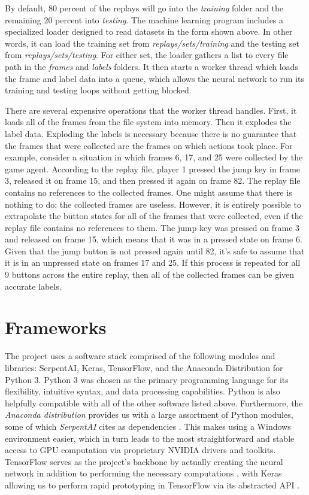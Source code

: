 By default, 80 percent of the replays will go into the \textit{training} folder and the remaining 20 percent into \textit{testing}. The machine learning program includes a specialized loader designed to read datasets in the form shown above. In other words, it can load the training set from \textit{replays/sets/training} and the testing set from \textit{replays/sets/testing}. For either set, the loader gathers a list to every file path in the \textit{frames} and \textit{labels} folders. It then starts a worker thread which loads the frame and label data into a queue, which allows the neural network to run its training and testing loops without getting blocked.

There are several expensive operations that the worker thread handles. First, it loads all of the frames from the file system into memory. Then it explodes the label data. Exploding the labels is necessary because there is no guarantee that the frames that were collected are the frames on which actions took place. For example, consider a situation in which frames 6, 17, and 25 were collected by the game agent. According to the replay file, player 1 pressed the jump key in frame 3, released it on frame 15, and then pressed it again on frame 82. The replay file contains no references to the collected frames. One might assume that there is nothing to do; the collected frames are useless. However, it is entirely possible to extrapolate the button states for all of the frames that were collected, even if the replay file contains no references to them. The jump key was pressed on frame 3 and released on frame 15, which means that it was in a pressed state on frame 6. Given that the jump button is not pressed again until 82, it's safe to assume that it is in an unpressed state on frames 17 and 25. If this process is repeated for all 9 buttons across the entire replay, then all of the collected frames can be given accurate labels.


\section{Frameworks}

The project uses a software stack comprised of the following modules and libraries: SerpentAI, Keras, TensorFlow, and the Anaconda Distribution for Python 3. Python 3 was chosen as the primary programming language for its flexibility, intuitive syntax, and data processing capabilities. Python is also helpfully compatible with all of the other software listed above. Furthermore, the {\it Anaconda distribution} provides us with a large assortment of Python modules, some of which {\it SerpentAI} cites as dependencies \cite{SerpentAI}. This makes using a Windows environment easier, which in turn leads to the most straightforward and stable access to GPU computation via proprietary NVIDIA drivers and toolkits. TensorFlow serves as the project's backbone by actually creating the neural network in addition to performing the necessary computations \cite{TensorFlow}, with Keras allowing us to perform rapid prototyping in TensorFlow via its abstracted API \cite{Keras}.

